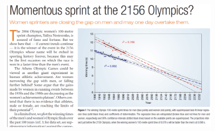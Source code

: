 \documentclass[12pt]{../notes}
\begin{document}
\nspace
{}

\begin{minipage}[l][3cm][c]{\textwidth}

\end{minipage}


\begin{figure}[H]
\centering
\includegraphics[width=\textwidth]{../figures/module2/sprint.png}
\end{figure}






\end{document}
